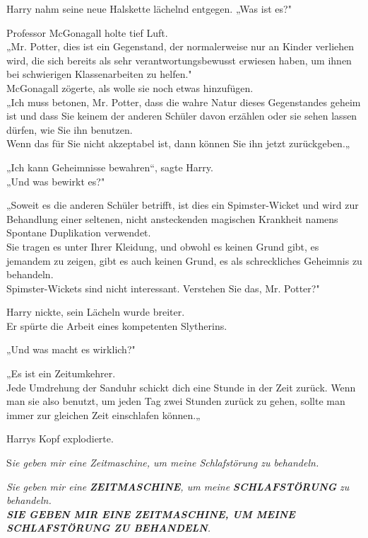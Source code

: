 {Harry nahm seine neue Halskette lächelnd entgegen. „Was ist es?"

Professor McGonagall holte tief Luft.\\ „Mr. Potter, dies ist ein Gegenstand, der normalerweise nur an Kinder verliehen wird, die sich bereits als sehr verantwortungsbewusst erwiesen haben, um ihnen bei schwierigen Klassenarbeiten zu helfen."\\ McGonagall zögerte, als wolle sie noch etwas hinzufügen.\\ „Ich muss betonen, Mr. Potter, dass die wahre Natur dieses Gegenstandes geheim ist und dass Sie keinem der anderen Schüler davon erzählen oder sie sehen lassen dürfen, wie Sie ihn benutzen.\\ Wenn das für Sie nicht akzeptabel ist, dann können Sie ihn jetzt zurückgeben.„

„Ich kann Geheimnisse bewahren“, sagte Harry.\\ „Und was bewirkt es?"

„Soweit es die anderen Schüler betrifft, ist dies ein Spimster-Wicket und wird zur Behandlung einer seltenen, nicht ansteckenden magischen Krankheit namens Spontane Duplikation verwendet.\\ Sie tragen es unter Ihrer Kleidung, und obwohl es keinen Grund gibt, es jemandem zu zeigen, gibt es auch keinen Grund, es als schreckliches Geheimnis zu behandeln.\\ Spimster-Wickets sind nicht interessant. Verstehen Sie das, Mr. Potter?"

Harry nickte, sein Lächeln wurde breiter.\\ Er spürte die Arbeit eines kompetenten Slytherins.

„Und was macht es wirklich?"

„Es ist ein Zeitumkehrer.\\ Jede Umdrehung der Sanduhr schickt dich eine Stunde in der Zeit zurück. Wenn man sie also benutzt, um jeden Tag zwei Stunden zurück zu gehen, sollte man immer zur gleichen Zeit einschlafen können.„

Harrys Kopf explodierte.

S\emph{ie geben mir eine Zeitmaschine, um meine Schlafstörung zu behandeln.}

\emph{Sie geben mir eine} \textbf{\emph{ZEITMASCHINE}}\emph{, um meine} \textbf{\emph{SCHLAFSTÖRUNG}} \emph{zu behandeln.}\\ \emph{\hfill\break }\textbf{\emph{SIE GEBEN MIR EINE ZEITMASCHINE, UM MEINE SCHLAFSTÖRUNG ZU BEHANDELN}}\emph{.}

}
